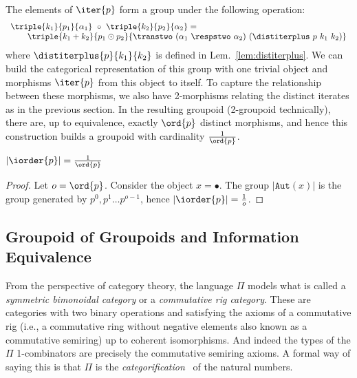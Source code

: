 The elements of $\iter{p}$ form a group under the following operation:
\[\begin{array}{l}
\triple{k_1}{p_1}{\alpha_1} ~\circ~ \triple{k_2}{p_2}{\alpha_2} = \\
\qquad  \triple{k_1+k_2}{p_1 \odot p_2}{\transtwo~(\alpha_1 ~\respstwo~
    \alpha_2)~(\distiterplus~p~k_1~k_2)}
\end{array}\]
where $\distiterplus{p}{k_1}{k_2}$ is defined in
Lem.~\ref{lem:distiterplus}. We can build the categorical
representation of this group with one trivial object and morphisms
$\iter{p}$ from this object to itself. To capture the relationship
between these morphisms, we also have 2-morphisms relating the
distinct iterates as in the previous section. In the resulting
groupoid (2-groupoid technically), there are, up to equivalence,
exactly $\ord{p}$ distinct morphisms, and hence this construction
builds a groupoid with cardinality $\frac{1}{\ord{p}}$.

\begin{lemma}
  $|\iorder{p}| = \frac{1}{\ord{p}}$
\end{lemma}
\begin{proof}
  Let $o = \ord{p}$. Consider the object $x = \bullet$. The group
  $|\texttt{Aut}(x)|$ is the group generated by
  $p^0, p^1 \dots p^{o-1}$, hence $|\iorder{p}| = \frac{1}{o}$.
\end{proof}

\subsection{Groupoid of Groupoids and Information Equivalence} 

From the perspective of category theory, the language $\Pi$ models
what is called a \emph{symmetric bimonoidal category} or a
\emph{commutative rig category}. These are categories with two binary
operations and satisfying the axioms of a commutative rig (i.e., a
commutative ring without negative elements also known as a commutative
semiring) up to coherent isomorphisms. And indeed the types of the
$\Pi$ 1-combinators are precisely the commutative semiring axioms. A
formal way of saying this is that $\Pi$ is the
\emph{categorification}~\cite{math/9802029} of the natural numbers. 

